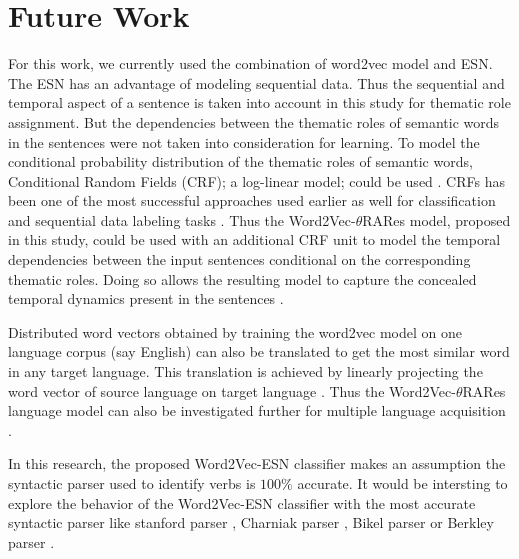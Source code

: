 \section{Future Work}

For this work, we currently used the combination of word2vec model and ESN. The ESN has an advantage of modeling sequential data. Thus the sequential and temporal aspect of a sentence is taken into account in this study for thematic role assignment. But the dependencies between the thematic roles of semantic words in the sentences were not taken into consideration for learning. To model the conditional probability distribution of the thematic roles of semantic words, Conditional Random Fields (CRF); a log-linear model; could be used \cite{crf:intro:sutton}. CRFs has been one of the most successful approaches used earlier as well for classification and sequential data labeling tasks \cite{end-to-end, esn:esn_crf}. Thus the Word2Vec-$\theta$RARes model, proposed in this study, could be used with an additional CRF unit to model the temporal dependencies between the input sentences conditional on the corresponding thematic roles. Doing so allows the resulting model to capture the concealed temporal dynamics present in the sentences \cite{esn:esn_crf}. 

Distributed word vectors obtained by training the word2vec model on one language corpus (say English) can also be translated to get the most similar word in any target language. This translation is achieved by linearly projecting the word vector of source language on target language \cite{w2v:language_similarities}. Thus the Word2Vec-$\theta$RARes language model can also be investigated further for multiple language acquisition \cite{hinaut_multiple_lang}. 

In this research, the proposed Word2Vec-ESN classifier makes an assumption the syntactic parser used to identify verbs is $100 \%$ accurate. It would be intersting to explore the behavior of the Word2Vec-ESN classifier with the most accurate syntactic parser like stanford parser \cite{parser:stanford}, Charniak parser \cite{charniak_parser:2000}, Bikel parser \cite{parser:bikel:2004} or Berkley parser \cite{parser:berkley:2006}.
